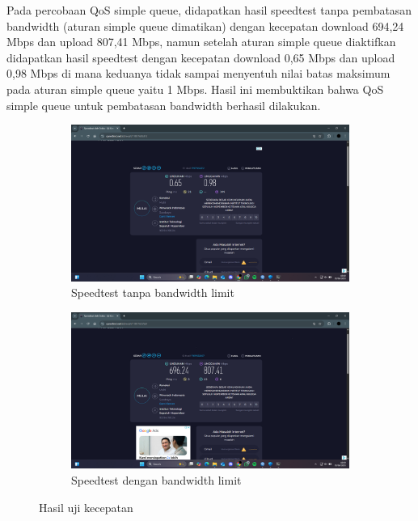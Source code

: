 Pada percobaan QoS simple queue, didapatkan hasil speedtest tanpa pembatasan bandwidth (aturan simple queue dimatikan) dengan kecepatan download 694,24 Mbps dan upload 807,41 Mbps, namun setelah aturan simple queue diaktifkan didapatkan hasil speedtest dengan kecepatan download 0,65 Mbps dan upload 0,98 Mbps di mana keduanya tidak sampai menyentuh nilai batas maksimum pada aturan simple queue yaitu 1 Mbps. Hasil ini membuktikan bahwa QoS simple queue untuk pembatasan bandwidth berhasil dilakukan.
\begin{figure}[H]
	\centering
	\begin{subfigure}[b]{0.4\linewidth}
		\centering
		\includegraphics[width=\linewidth]{P5/img/speedtest (1).png}
		\caption{Speedtest tanpa bandwidth limit\label{fig:konfigurasiR1}}
	\end{subfigure}
	\begin{subfigure}[b]{0.4\linewidth}
		\centering
		\includegraphics[width=\linewidth]{P5/img/speedtest (2).png}
		\caption{Speedtest dengan bandwidth limit\label{fig:konfigurasiR2}}
	\end{subfigure}
	\caption{Hasil uji kecepatan}
	\hspace{1cm}
\end{figure}

